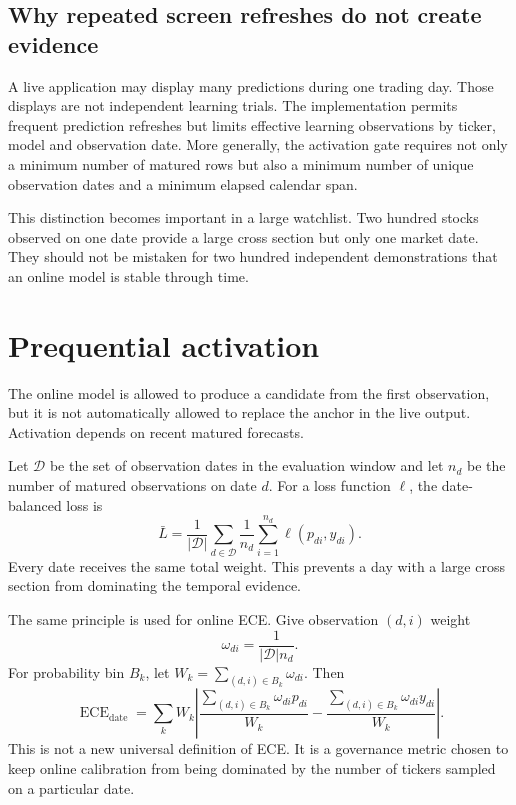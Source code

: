 \documentclass[11pt]{article}
\begin{document}
\subsection{Why repeated screen refreshes do not create evidence}

A live application may display many predictions during one trading day. Those displays are not independent learning trials. The implementation permits frequent prediction refreshes but limits effective learning observations by ticker, model and observation date. More generally, the activation gate requires not only a minimum number of matured rows but also a minimum number of unique observation dates and a minimum elapsed calendar span.

This distinction becomes important in a large watchlist. Two hundred stocks observed on one date provide a large cross section but only one market date. They should not be mistaken for two hundred independent demonstrations that an online model is stable through time.

\section{Prequential activation}
\label{sec:gate}

The online model is allowed to produce a candidate from the first observation, but it is not automatically allowed to replace the anchor in the live output. Activation depends on recent matured forecasts.

Let $\mathcal D$ be the set of observation dates in the evaluation window and let $n_d$ be the number of matured observations on date $d$. For a loss function $\ell$, the date-balanced loss is
\begin{equation}
\bar L
=\frac{1}{|\mathcal D|}
\sum_{d\in\mathcal D}
\frac{1}{n_d}\sum_{i=1}^{n_d}\ell(p_{di},y_{di}).
\label{eq:datebalancedloss}
\end{equation}
Every date receives the same total weight. This prevents a day with a large cross section from dominating the temporal evidence.

The same principle is used for online ECE. Give observation $(d,i)$ weight
\begin{equation}
\omega_{di}=\frac{1}{|\mathcal D|n_d}.
\label{eq:dateweight}
\end{equation}
For probability bin $B_k$, let $W_k=\sum_{(d,i)\in B_k}\omega_{di}$. Then
\begin{equation}
\operatorname{ECE}_{\mathrm{date}}
=\sum_k W_k\left|
\frac{\sum_{(d,i)\in B_k}\omega_{di}p_{di}}{W_k}
-
\frac{\sum_{(d,i)\in B_k}\omega_{di}y_{di}}{W_k}
\right|.
\label{eq:dateece}
\end{equation}
This is not a new universal definition of ECE. It is a governance metric chosen to keep online calibration from being dominated by the number of tickers sampled on a particular date.
\end{document}
